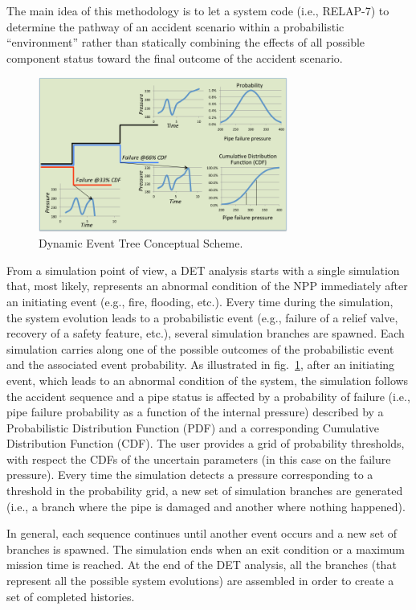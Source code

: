 The main idea of this methodology is to let a system code (i.e., RELAP-7) to determine the pathway of an accident scenario within a probabilistic “environment” rather than statically combining the effects of all possible component status toward the final outcome of the accident scenario.
\begin{figure}[h] 
  \centering
     \includegraphics[width=0.73\textwidth]{figures/DET_schemeFlow.png}
  \caption{Dynamic Event Tree Conceptual Scheme.}
   \label{fig:DET_schemeFlow}
\end{figure}

From a simulation point of view, a DET analysis starts with a single simulation that, most likely, represents an abnormal condition of the NPP immediately after an initiating event (e.g., fire, flooding, etc.). Every time during the simulation, the system evolution leads to a probabilistic event (e.g., failure of a relief valve, recovery of a safety feature, etc.), several simulation branches are spawned. Each simulation carries along one of the possible outcomes of the probabilistic event and the associated event probability. As illustrated in fig.~\ref{fig:DET_schemeFlow}, after an initiating event, which leads to an abnormal condition of the system, the simulation follows the accident sequence and a pipe status is affected by a probability of failure (i.e., pipe failure probability as a function of the internal pressure) described by a Probabilistic Distribution Function (PDF) and a corresponding Cumulative Distribution Function (CDF). The user provides a grid of probability thresholds, with respect the CDFs of the uncertain parameters (in this case on the failure pressure). Every time the simulation detects a pressure corresponding to a threshold in the probability grid, a new set of simulation branches are generated (i.e., a branch where the pipe is damaged and another where nothing happened).

In general, each sequence continues until another event occurs and a new set of branches is spawned. The simulation ends when an exit condition or a maximum mission time is reached. At the end of the DET analysis, all the branches (that represent all the possible system evolutions) are assembled in order to create a set of completed histories.   

